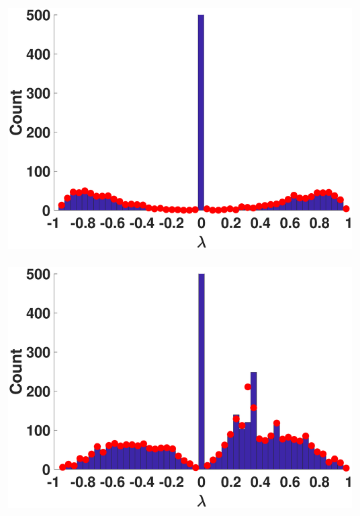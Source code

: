 \begin{figure}[htp]
  \begin{subfigure}[t]{0.19\textwidth}
    \centering  
    \captionsetup{justification=centering,font=scriptsize}
    \includegraphics[width=\textwidth,trim = .4cm 0.5cm 3.5cm 1.3cm,clip]
    {./ndos/pics/erdos}
    \label{fig:erdos_dos}
  \end{subfigure}
  \begin{subfigure}[t]{0.19\textwidth}
    \centering  
    \captionsetup{justification=centering,font=scriptsize}
    \includegraphics[width=\textwidth,trim = .4cm 0.5cm 3.5cm 1.3cm,clip]
    {./ndos/pics/as19991115}
    \label{fig:as_dos}
  \end{subfigure}
  \begin{subfigure}[t]{0.19\textwidth}
    \centering
    \captionsetup{justification=centering,font=scriptsize}

\end{subfigure}
\end{figure}
